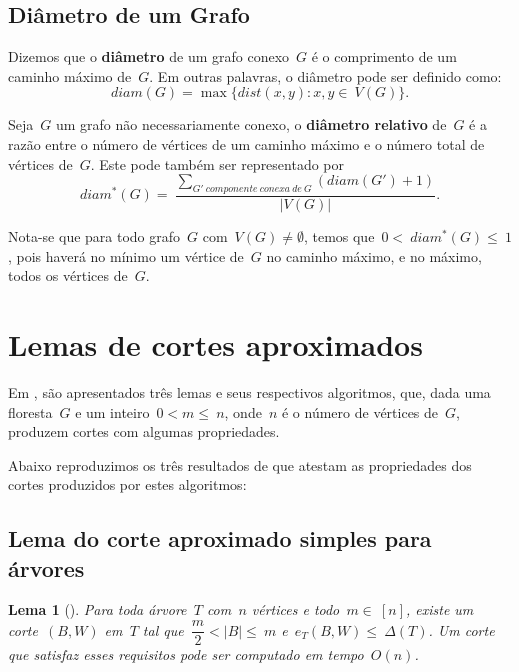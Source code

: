 \documentclass[a4paper,12pt]{article}
\newtheorem{lem}{Lema}
\begin{document}
	\bigskip
	\bigskip


	\subsection{Diâmetro de um Grafo}
	\label{subsec:diametro}
	Dizemos que o \textbf{diâmetro} de um grafo conexo~$G$ é o
	comprimento de um caminho máximo de~$G$. 
	Em outras palavras, o diâmetro pode ser definido como:
	$$ diam(G)=\max\{dist(x,y):x,y\in~V(G)\}.$$

	\bigskip

	Seja~$G$ um grafo não necessariamente conexo,
	o \textbf{diâmetro relativo} de~$G$
	 é a razão entre o número
	de vértices de um caminho máximo e o número total de vértices
	de~$G$. Este pode também ser representado por
	$$ diam^*(G) =~\dfrac{\displaystyle\sum_{
	G'~componente~conexa~de~G}^{}(diam(G')+1)}{|V(G)|}.$$

	\medskip

	Nota-se que para todo grafo~$G$ com~$V(G)\ne \emptyset$, temos
	que~$0<~diam^*(G)\le~1$, pois haverá no mínimo um vértice 
	de~$G$ no caminho máximo, e no máximo, todos os vértices 
	de~$G$.
    
\newpage
\section {Lemas de cortes aproximados}

Em \cite{Schmidt15}, são apresentados três lemas e seus
respectivos algoritmos, que, dada uma floresta~$G$ e um 
inteiro~$0<m\le~n$, onde~$n$ é o número de vértices de~$G$, 
produzem cortes com algumas propriedades.

Abaixo reproduzimos os três resultados de \cite{Schmidt15} que 
atestam as propriedades dos cortes produzidos por estes algoritmos:

\bigskip
\bigskip
\bigskip

\subsection{Lema do corte aproximado simples para árvores}
\begin{lem}[]
\label{lema:simpleApproxCutTree}
	Para toda árvore~$T$ com~$n$ vértices e todo~$m \in~[n]$,
	existe um corte~$(B,W)$ em~$T$ tal 
	que~$\dfrac{m}{2} <|B| \le~m$ e~$e_T(B,W) \le~\Delta(T)$.
	Um corte que satisfaz esses requisitos pode ser computado em
	tempo~$O(n)$.
\end{lem}
\end{document}
